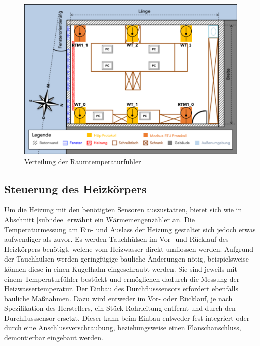 \begin{figure}
\centering
\includegraphics[width=\textwidth]{abbildungen/20160324_sensors}
\caption{Verteilung der Raumtemperaturfühler}
\label{fig:raumtempsensors}
\end{figure}

\subsection{Steuerung des Heizkörpers}

Um die Heizung mit den benötigten Sensoren auszustatten, bietet sich wie in Abschnitt \ref{sub:idee} erwähnt ein Wärmemengenzähler an. Die Temperaturmessung am Ein- und Auslass der Heizung gestaltet sich jedoch etwas aufwendiger als zuvor. Es werden Tauchhülsen im Vor- und Rücklauf des Heizkörpers benötigt, welche vom Heizwasser direkt umflossen werden. Aufgrund der Tauchhülsen werden geringfügige bauliche Änderungen nötig, beispielsweise können diese in einen Kugelhahn eingeschraubt werden. Sie sind jeweils mit einem Temperaturfühler bestückt und ermöglichen dadurch die Messung der Heizwassertemperatur. Der Einbau des Durchflusssensors erfordert ebenfalls bauliche Maßnahmen. Dazu wird entweder im Vor- oder Rücklauf, je nach Spezifikation des Herstellers, ein Stück Rohrleitung entfernt und durch den Durchflusssensor ersetzt. Dieser kann beim Einbau entweder fest integriert oder durch eine Anschlussverschraubung, beziehungsweise einen Flanschanschluss, demontierbar eingebaut werden.

